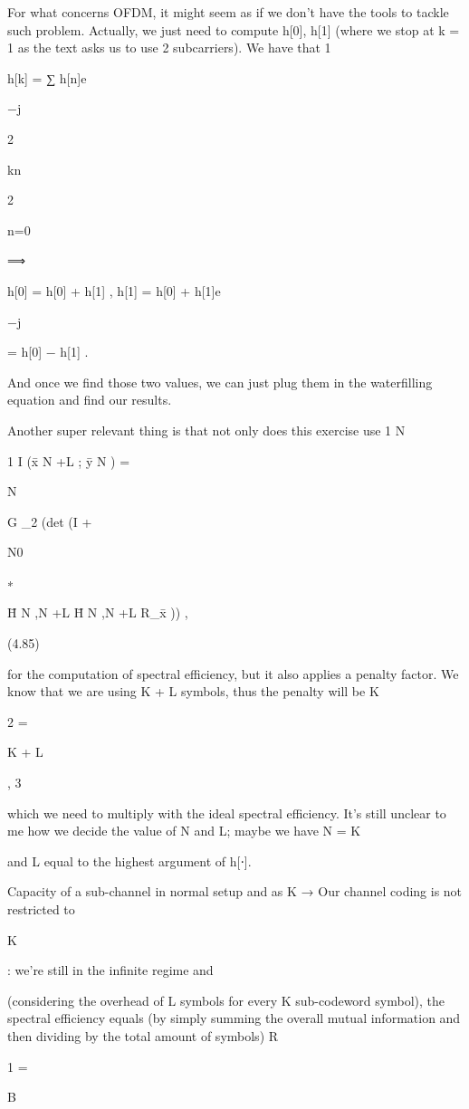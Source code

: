 {{{{{For what concerns OFDM, it might seem as if we don't have the tools to tackle such problem. Actually, we just need to compute h[0], h[1] (where we stop at k = 1 as the text asks us to use 2 subcarriers).
We have that 1

h[k] = ∑ h[n]e

−j

2\pi

kn

2

n=0

⟹

h[0] = h[0] + h[1] ,
h[1] = h[0] + h[1]e

−j\pi

= h[0] − h[1] .

And once we find those two values, we can just plug them in the waterfilling equation and find our results.

Another super relevant thing is that not only does this exercise use 1 N

1 I (x̄ N +L ; ȳ N ) =

N

G
\log_2 (det (I +

N0

∗

H̄ N ,N +L H̄ N ,N +L R_x̄ )) ,

(4.85)

for the computation of spectral efficiency, but it also applies a penalty factor. We know that we are using K + L symbols, thus the penalty will be K

2
=

K + L

,
3

which we need to multiply with the ideal spectral efficiency.
It's still unclear to me how we decide the value of N and L; maybe we have N = K

and L equal to the highest argument of h[⋅].

Capacity of a sub-channel in normal setup and as K → \infty Our channel coding is not restricted to

K

: we're still in the infinite regime and

(considering the overhead of L symbols for every K sub-codeword symbol), the spectral efficiency equals (by simply summing the overall mutual information and then dividing by the total amount of symbols)
R

1
=

B

}}}}}
